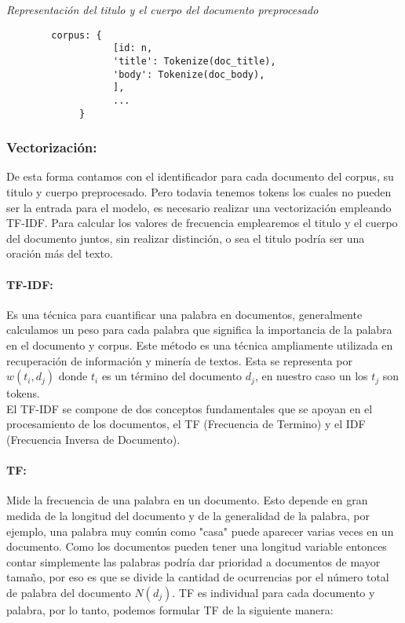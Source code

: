 \documentclass[runningheads,a4paper]{llncs}
\begin{document}
\noindent
{\it Representación del titulo y el cuerpo del documento preprocesado}
\begin{verbatim}
	    corpus: {
                   [id: n,
                   'title': Tokenize(doc_title),
                   'body': Tokenize(doc_body),
                   ],
                   ...
             }
\end{verbatim}
%
\noindent

\subsubsection{Vectorización:} De esta forma contamos con el identificador para cada documento del corpus, su titulo y cuerpo preprocesado. Pero todavia tenemos tokens los cuales no pueden ser la entrada para el modelo, es necesario realizar una vectorización
empleando TF-IDF. Para calcular los valores de frecuencia emplearemos el titulo y el cuerpo del documento juntos, sin realizar distinción, o sea el titulo podría ser una oración más del texto.

\paragraph*{TF-IDF:} Es una técnica para cuantificar una palabra en documentos, generalmente calculamos un peso para cada palabra que significa la importancia de la palabra en el documento y corpus. Este método es una técnica ampliamente utilizada en recuperación de información y minería de textos. Esta se representa por $w(t_i, d_j)$ donde $t_i$ es un término del documento $d_j$, en nuestro caso un los $t_j$ son tokens. \\

El TF-IDF se compone de dos conceptos fundamentales que se apoyan en el procesamiento de los documentos, el TF (Frecuencia de Termino) y el IDF (Frecuencia Inversa de Documento).

\paragraph*{TF:} Mide la frecuencia de una palabra en un documento. Esto depende en gran medida de la longitud del documento y de la generalidad de la palabra, por ejemplo, una palabra muy común como "casa" puede aparecer varias veces en un documento. Como los documentos pueden tener una longitud variable entonces contar simplemente las palabras podría dar prioridad a documentos de mayor tamaño, por eso es que se divide la cantidad de ocurrencias por el número total de palabra del documento $N(d_j)$. TF es individual para cada documento y palabra, por lo tanto, podemos formular TF de la siguiente manera:
\end{document}

